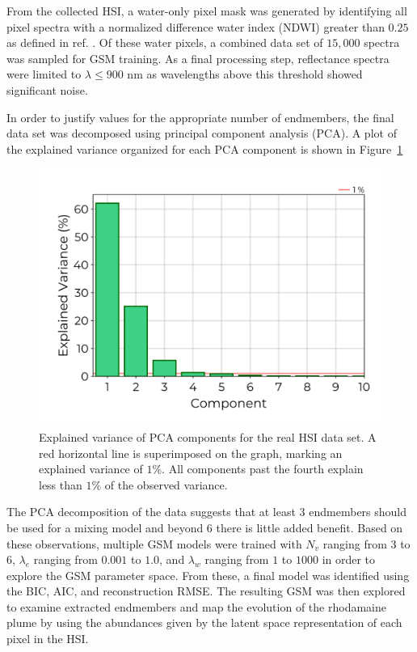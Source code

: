\documentclass[remotesensing,article,submit,pdftex,moreauthors]{Definitions/mdpi}
\begin{document}
From the collected HSI, a water-only pixel mask was generated by identifying all pixel spectra with a normalized difference water index (NDWI) greater than $0.25$ as defined in ref. \cite{ndwi}. Of these water pixels, a combined data set of $15,000$ spectra was sampled for GSM training. As a final processing step, reflectance spectra were limited to $\lambda \leq 900$ nm as wavelengths above this threshold showed significant noise.

In order to justify values for the appropriate number of endmembers, the final data set was decomposed using principal component analysis (PCA). A plot of the explained variance organized for each PCA component is shown in Figure~\ref{fig:robot-team-pca}
\begin{figure}[H]
\begin{center}
\includegraphics[width=0.60\columnwidth]{results/robot-team/pca-variance.png}
\end{center}
\vspace{-20pt}
\caption{Explained variance of PCA components for the real HSI data set. A red horizontal line is superimposed on the graph, marking an explained variance of $1\%$. All components past the fourth explain less than $1\%$ of the observed variance.}
\label{fig:robot-team-pca}
\end{figure}  
The PCA decomposition of the data suggests that at least $3$ endmembers should be used for a mixing model and beyond $6$ there is little added benefit. Based on these observations, multiple GSM models were trained with $N_v$ ranging from $3$ to $6$, $\lambda_e$ ranging from $0.001$ to $1.0$, and $\lambda_w$ ranging from $1$ to $1000$ in order to explore the GSM parameter space. From these, a final model was identified using the BIC, AIC, and reconstruction RMSE. The resulting GSM was then explored to examine extracted endmembers and map the evolution of the rhodamaine plume by using the abundances given by the latent space representation of each pixel in the HSI.
\end{document}
